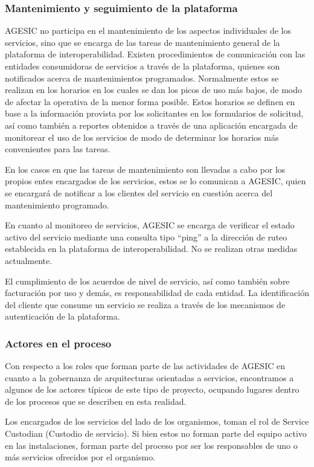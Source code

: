 \subsubsection{Mantenimiento y seguimiento de la plataforma}	
\label{Analisis:MantenimientoSeguimientoPlataforma}
AGESIC no participa en el mantenimiento de los aspectos individuales de los servicios, sino que se encarga de las tareas de mantenimiento general de la plataforma de interoperabilidad. Existen procedimientos de comunicación con las entidades consumidoras de servicios a través de la plataforma, quienes son notificados acerca de mantenimientos programados. Normalmente estos se realizan en los horarios en los cuales se dan los picos de uso más bajos, de modo de afectar la operativa de la menor forma posible. Estos horarios se definen en base a la información provista por los solicitantes en los formularios de solicitud, así como también a reportes obtenidos a través de una aplicación encargada de monitorear el uso de los servicios de modo de determinar los horarios más convenientes para las tareas.

En los casos en que las tareas de mantenimiento son llevadas a cabo por los propios entes encargados de los servicios, estos se lo comunican a AGESIC, quien se encargará de notificar a los clientes del servicio en cuestión acerca del mantenimiento programado.

En cuanto al monitoreo de servicios, AGESIC se encarga de verificar el estado activo del servicio mediante una consulta tipo “ping” a la dirección de ruteo establecida en la plataforma de interoperabilidad. No se realizan otras medidas actualmente. 

El cumplimiento de los acuerdos de nivel de servicio, así como también sobre facturación por uso y demás, es responsabilidad de cada entidad. La identificación del cliente que consume un servicio se realiza a través de los mecanismos de autenticación de la plataforma.

\subsubsection{Actores en el proceso}	
\label{Analisis:ActoresDelProceso}
Con respecto a los roles que forman parte de las actividades de AGESIC en cuanto a la gobernanza de arquitecturas orientadas a servicios, encontramos a algunos de los actores típicos de este tipo de proyecto, ocupando lugares dentro de los procesos que se describen en esta realidad.

Los encargados de los servicios del lado de los organismos, toman el rol de Service Custodian (Custodio de servicio). Si bien estos no forman parte del equipo activo en las instalaciones, forman parte del proceso por ser los responsables de uno o más servicios ofrecidos por el organismo.

